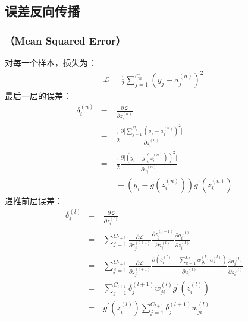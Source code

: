 \documentclass[letterpaper,10pt,english]{sphinxmanual}
\begin{document}
\subsection{误差反向传播}
\label{\detokenize{deepLearning/07_backprop:id3}}

\subsubsection{ （Mean Squared Error）}
\label{\detokenize{deepLearning/07_backprop:mse-mean-squared-error}}
对每一个样本，损失为：
\begin{equation*}
\begin{split}\mathcal{L} = \frac{1}{2} \sum_{j=1}^{C_n}(y_j - a^{(n)}_j)^2.\end{split}
\end{equation*}
最后一层的误差：
\begin{equation*}
\begin{split}\delta^{(n)}_i & = & \  \frac{\partial{\mathcal{L}}}{\partial{z^{(n)}_i}} \\
               & = & \  \frac{1}{2} \frac{\partial{\bigg [ \sum_{j=1}^{C_n}(y_j - a^{(n)}_j)^2 \bigg ]}}{\partial{z^{(n)}_i}} \\
               & = & \  \frac{1}{2} \frac{\partial{\bigg [ (y_i - g(z^{(n)}_i))^2 \bigg ]}}{\partial{z^{(n)}_i}} \\
               & = & \  - (y_i - g(z^{(n)}_i)) g^{\prime}(z^{(n)}_i)\end{split}
\end{equation*}
递推前层误差：
\begin{equation*}
\begin{split}\delta^{(l)}_i & = & \  \frac{\partial{\mathcal{L}}}{\partial{z^{(l)}_i}} \\
                & = & \  \sum_{j=1}^{C_{l+1}} \frac{\partial{\mathcal{L}}}{\partial{z^{(l+1)}_j}} \frac{\partial{z^{(l+1)}_j}}{\partial{a^{(l)}_i}} \frac{\partial{a^{(l)}_i}}{\partial{z^{(l)}_i}} \\
                & = & \  \sum_{j=1}^{C_{l+1}} \frac{\partial{\mathcal{L}}}{\partial{z^{(l+1)}_j}} \frac{\partial{\left ( b^{(l)}_i + \sum_{k=1}^{C_l}w^{(l)}_{jk}a^{(l)}_k \right )}}{\partial{a^{(l)}_i}} \frac{\partial{a^{(l)}_i}}{\partial{z^{(l)}_i}} \\
                & = & \  \sum_{j=1}^{C_{l+1}} \delta^{(l+1)}_j w_{ji}^{(l)} g^{\prime}(z^{(l)}_i) \\
                & = & \  g^{\prime}(z^{(l)}_i) \sum_{j=1}^{C_{l+1}} \delta^{(l+1)}_j w_{ji}^{(l)}\end{split}
\end{equation*}
\end{document}
